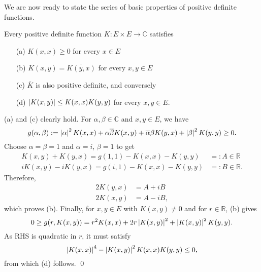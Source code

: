 \documentclass[a4paper,12pt]{article}
\begin{document}
We are now ready to state the series of basic properties of positive definite functions.
\begin{prp}
	Every positive definite function \( K:E \times E \to \mathbb{C} \) satisfies
	\begin{itemize}
		\item[(a)] \( K(x,x) \ge 0 \) for every \( x \in E \)
		\item[(b)] \( K(x,y)=\overline{K(y,x)} \) for every \( x,y \in E \)
		\item[(c)] \( \overline{K} \) is also positive definite, and conversely
		\item[(d)] \( \left| K(x,y) \right| \le K(x,x)K(y,y) \) for every \( x,y \in E \).
	\end{itemize}
\end{prp}
\begin{prf}
	(a) and (c) clearly hold. For \( \alpha, \beta \in \mathbb{C} \) and \( x,y \in E \), we have
	\begin{equation*}
		g(\alpha,\beta) := \left| \alpha \right|^2 K(x,x) + \alpha \overline{\beta}K(x,y) + \overline{\alpha}\beta K(y,x) + \left| \beta \right|^2 K(y,y) \ge 0.
	\end{equation*}
	Choose \( \alpha=\beta=1 \) and \( \alpha = i \), \( \beta=1 \) to get
	\begin{equation*}
		\begin{aligned}
			K(x,y) + K(y,x) = g(1,1) - K(x,x) - K(y,y)     & =: A \in \mathbb{R}  \\
			i K(x,y) - i K(y,x) = g(i,1) - K(x,x) - K(y,y) & =: B \in \mathbb{R}.
		\end{aligned}
	\end{equation*}
	Therefore,
	\begin{equation*}
		\begin{aligned}
			2 K(y,x) & = A + iB  \\
			2 K(x,y) & = A - iB,
		\end{aligned}
	\end{equation*}
	which proves (b). Finally, for \( x,y \in E \) with \( K(x,y) \neq 0 \) and for \( r \in \mathbb{R} \), (b) gives
	\begin{equation*}
		0 \ge g(r,K(x,y)) = r ^2 K(x,x) + 2r \left| K(x,y) \right|^2 + \left| K(x,y) \right|^2K(y,y).
	\end{equation*}
	As RHS is quadratic in \( r \), it must satisfy
	\begin{equation*}
		\left| K(x,x) \right|^4 - \left| K(x,y) \right|^2K(x,x)K(y,y) \le 0,
	\end{equation*}
	from which (d) follows.
	\qed\end{prf}
\end{document}

